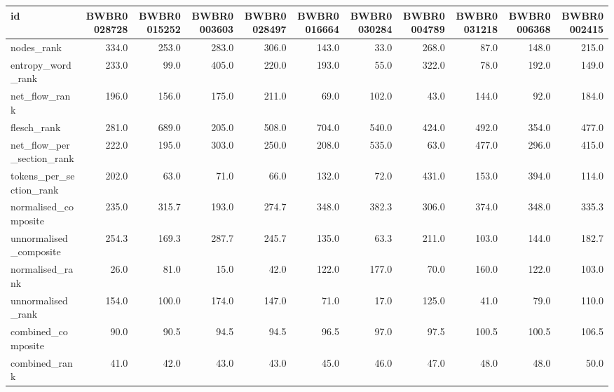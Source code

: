 \begin{tabular}{lrrrrrrrrrr}
\toprule
id & BWBR0028728 & BWBR0015252 & BWBR0003603 & BWBR0028497 & BWBR0016664 & BWBR0030284 & BWBR0004789 & BWBR0031218 & BWBR0006368 & BWBR0002415 \\
\midrule
nodes\_rank & 334.0 & 253.0 & 283.0 & 306.0 & 143.0 & 33.0 & 268.0 & 87.0 & 148.0 & 215.0 \\
\cline{1-11}
entropy\_word\_rank & 233.0 & 99.0 & 405.0 & 220.0 & 193.0 & 55.0 & 322.0 & 78.0 & 192.0 & 149.0 \\
\cline{1-11}
net\_flow\_rank & 196.0 & 156.0 & 175.0 & 211.0 & 69.0 & 102.0 & 43.0 & 144.0 & 92.0 & 184.0 \\
\cline{1-11}
flesch\_rank & 281.0 & 689.0 & 205.0 & 508.0 & 704.0 & 540.0 & 424.0 & 492.0 & 354.0 & 477.0 \\
\cline{1-11}
net\_flow\_per\_section\_rank & 222.0 & 195.0 & 303.0 & 250.0 & 208.0 & 535.0 & 63.0 & 477.0 & 296.0 & 415.0 \\
\cline{1-11}
tokens\_per\_section\_rank & 202.0 & 63.0 & 71.0 & 66.0 & 132.0 & 72.0 & 431.0 & 153.0 & 394.0 & 114.0 \\
\cline{1-11}
normalised\_composite & 235.0 & 315.7 & 193.0 & 274.7 & 348.0 & 382.3 & 306.0 & 374.0 & 348.0 & 335.3 \\
\cline{1-11}
unnormalised\_composite & 254.3 & 169.3 & 287.7 & 245.7 & 135.0 & 63.3 & 211.0 & 103.0 & 144.0 & 182.7 \\
\cline{1-11}
normalised\_rank & 26.0 & 81.0 & 15.0 & 42.0 & 122.0 & 177.0 & 70.0 & 160.0 & 122.0 & 103.0 \\
\cline{1-11}
unnormalised\_rank & 154.0 & 100.0 & 174.0 & 147.0 & 71.0 & 17.0 & 125.0 & 41.0 & 79.0 & 110.0 \\
\cline{1-11}
combined\_composite & 90.0 & 90.5 & 94.5 & 94.5 & 96.5 & 97.0 & 97.5 & 100.5 & 100.5 & 106.5 \\
\cline{1-11}
combined\_rank & 41.0 & 42.0 & 43.0 & 43.0 & 45.0 & 46.0 & 47.0 & 48.0 & 48.0 & 50.0 \\
\cline{1-11}
\bottomrule
\end{tabular}
